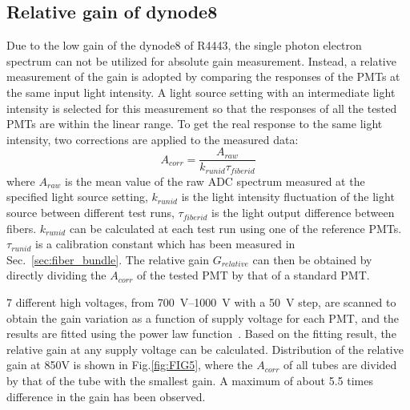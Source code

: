 \documentclass[a4paper,10pt,twoside]{cpc-hepnp}
\begin{document}
\begin{CJK*}{UTF8}{gbsn}
\begin{multicols}{2}
\subsection{Relative gain of dynode8}
\label{sec:psd_gain}

Due to the low gain of the dynode8 of R4443, the single photon electron spectrum can not be utilized for absolute gain measurement.
Instead, a relative measurement of the gain is adopted by comparing the responses of the PMTs at the same input light intensity.
A light source setting with an intermediate light intensity is selected for this measurement so that the responses of all the tested PMTs are within the linear range.    
To get the real response to the same light intensity, two corrections are applied to the measured data:
\begin{equation}
A_{corr} = \frac{A_{raw}}{k_{runid}\tau_{fiberid}}
\end{equation} 
where $A_{raw}$ is the mean value of the raw ADC spectrum measured at the specified light source setting,
$k_{runid}$ is the light intensity fluctuation of the light source between different test runs,
$\tau_{fiberid}$ is the light output difference between fibers.
$k_{runid}$ can be calculated at each test run using one of the reference PMTs.
$\tau_{runid}$ is a calibration constant which has been measured in Sec.~\ref{sec:fiber_bundle}.
The relative gain $G_{relative}$ can then be obtained by directly dividing the $A_{corr}$ of the tested PMT by that of a standard PMT.   

7 different high voltages, from \SIrange{700}{1000}{\volt} with a \SI{50}{\volt} step, are scanned to obtain the gain variation as a function of supply voltage for each PMT, and the results are fitted using the power law function~\citep{hamamatsu}.
Based on the fitting result, the relative gain at any supply voltage can be calculated.
Distribution of the relative gain at 850V is shown in Fig.\ref{fig:FIG5}, where the $A_{corr}$ of all tubes are divided by that of the tube with the smallest gain. 
A maximum of about 5.5 times difference in the gain has been observed.


\end{multicols}
\end{CJK*}
\end{document}
